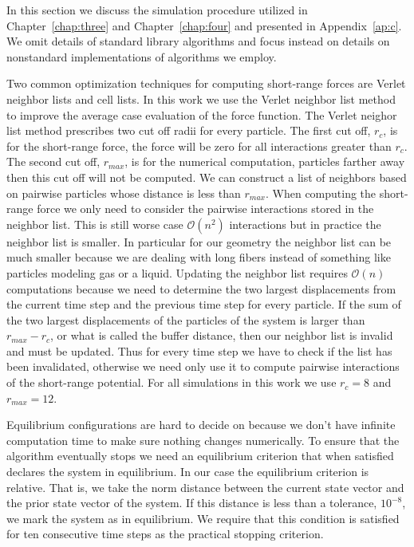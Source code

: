    In this section we discuss the simulation procedure utilized in Chapter~\ref{chap:three} and Chapter~\ref{chap:four} and presented in Appendix~\ref{ap:c}. We omit details of standard library algorithms and focus instead on details on nonstandard implementations of algorithms we employ.

Two common optimization techniques for computing short-range forces are Verlet neighbor lists and cell lists.
In this work we use the Verlet neighbor list method to improve the average case evaluation of the force function.
The Verlet neighor list method prescribes two cut off radii for every particle. 
The first cut off, $r_c$, is for the short-range force, the force will be zero for all interactions greater than $r_c$.
The second cut off, $r_{max}$, is for the numerical computation, particles farther away then this cut off will not be computed.
We can construct a list of neighbors based on pairwise particles whose distance is less than $r_{max}$. 
When computing the short-range force we only need to consider the pairwise interactions stored in the neighbor list. This is still worse case $\mathcal{O}(n^2)$ interactions but in practice the neighbor list is smaller.
In particular for our geometry the neighbor list can be much smaller because we are dealing with long fibers instead of something like particles modeling gas or a liquid.
Updating the neighbor list requires $\mathcal{O}(n)$ computations because we need to determine the two largest displacements from the current time step and the previous time step for every particle.
If the sum of the two largest displacements of the particles of the system is larger than $r_{max} - r_c$, or what is called the buffer distance, then our neighbor list is invalid and must be updated.
Thus for every time step we have to check if the list has been invalidated, otherwise we need only use it to compute pairwise interactions of the short-range potential.
For all simulations in this work we use $r_c = 8$ and $r_{max} = 12$.

   Equilibrium configurations are hard to decide on because we don't have infinite computation time to make sure nothing changes numerically. To ensure that the algorithm eventually stops we need an equilibrium criterion that when satisfied declares the system in equilibrium. In our case the equilibrium criterion is relative. That is, we take the norm distance between the current state vector and the prior state vector of the system. If this distance is less than a tolerance, $10^{-8}$, we mark the system as in equilibrium. We require that this condition is satisfied for ten consecutive time steps as the practical stopping criterion.
   
